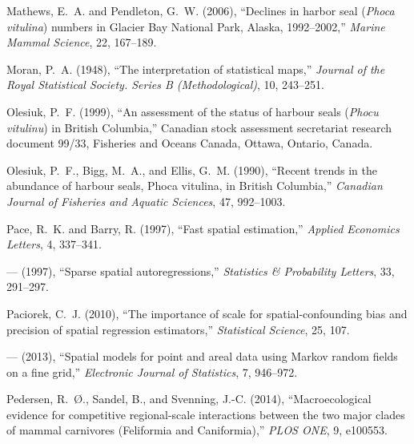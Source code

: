 \documentclass[11pt, titlepage]{article}\usepackage[]{graphicx}\usepackage[]{color}
\begin{document}
\begin{spacing}{1.9}
\begin{flushleft}
\begin{thebibliography}{126}
Mathews, E.~A. and Pendleton, G.~W. (2006), \enquote{Declines in harbor seal
  (\emph{Phoca vitulina}) numbers in {G}lacier {B}ay {N}ational {P}ark,
  {A}laska, 1992--2002,} \textit{Marine Mammal Science}, 22, 167--189.

Moran, P.~A. (1948), \enquote{The interpretation of statistical maps,}
  \textit{Journal of the Royal Statistical Society. Series B (Methodological)},
  10, 243--251.

Olesiuk, P.~F. (1999), \enquote{An assessment of the status of harbour seals
  (\emph{Phocu vitulinu}) in British Columbia,} Canadian stock assessment
  secretariat research document 99/33, Fisheries and Oceans Canada, Ottawa,
  Ontario, Canada.

Olesiuk, P.~F., Bigg, M.~A., and Ellis, G.~M. (1990), \enquote{Recent trends in
  the abundance of harbour seals, Phoca vitulina, in British Columbia,}
  \textit{Canadian Journal of Fisheries and Aquatic Sciences}, 47, 992--1003.

Pace, R.~K. and Barry, R. (1997{}), \enquote{Fast spatial
  estimation,} \textit{Applied Economics Letters}, 4, 337--341.

--- (1997{}), \enquote{Sparse spatial autoregressions,}
  \textit{Statistics \& Probability Letters}, 33, 291--297.

Paciorek, C.~J. (2010), \enquote{The importance of scale for
  spatial-confounding bias and precision of spatial regression estimators,}
  \textit{Statistical Science}, 25, 107.

--- (2013), \enquote{Spatial models for point and areal data using Markov
  random fields on a fine grid,} \textit{Electronic Journal of Statistics}, 7,
  946--972.

Pedersen, R.~{\O}., Sandel, B., and Svenning, J.-C. (2014),
  \enquote{Macroecological evidence for competitive regional-scale interactions
  between the two major clades of mammal carnivores (Feliformia and
  Caniformia),} \textit{PLOS ONE}, 9, e100553.


\end{thebibliography}
\end{flushleft}
\end{spacing}
\end{document}
